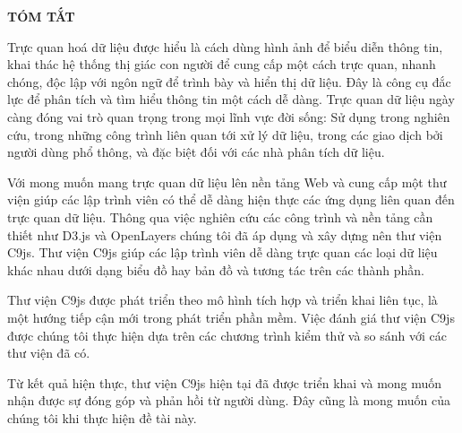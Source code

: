 \begin{titlepage}
\centering
	{\scshape\LARGE \textbf{TÓM TẮT} \par}
	\vspace{1cm}
	
\justify
Trực quan hoá dữ liệu được hiểu là cách dùng hình ảnh để biểu diễn thông tin, khai thác hệ thống thị giác con người để cung cấp một cách trực quan, nhanh chóng, độc lập với ngôn ngữ để trình bày và hiển thị dữ liệu. Đây là công cụ đắc lực để phân tích và tìm hiểu thông tin một cách dễ dàng. Trực quan dữ liệu ngày càng đóng vai trò quan trọng trong mọi lĩnh vực đời sống: Sử dụng trong nghiên cứu, trong những công trình liên quan tới xử lý dữ liệu, trong các giao dịch bởi người dùng phổ thông, và đặc biệt
đối với các nhà phân tích dữ liệu.\par
Với mong muốn mang trực quan dữ liệu lên nền tảng Web và cung cấp một thư viện giúp các lập trình viên có thể dễ dàng hiện thực các ứng dụng liên quan đến trực quan dữ liệu. Thông qua việc nghiên cứu các công trình và nền tảng cần thiết như D3.js và OpenLayers chúng tôi đã áp dụng và xây dựng nên thư viện C9js. Thư viện C9js giúp các lập trình viên dễ dàng trực quan các loại dữ liệu khác nhau dưới dạng biểu đồ hay bản đồ và tương tác trên các thành phần.\par
Thư viện C9js được phát triển theo mô hình tích hợp và triển khai liên tục, là một hướng tiếp cận mới trong phát triển phần mềm. Việc đánh giá thư viện C9js được chúng tôi thực hiện dựa trên các chương trình kiểm thử và so sánh với các thư viện đã có.\par
Từ kết quả hiện thực, thư viện C9js hiện tại đã được triển khai và mong muốn nhận được sự đóng góp và phản hồi từ người dùng. Đây cũng là mong muốn của chúng tôi khi thực hiện đề tài này.\par


\vfill %
\end{titlepage}